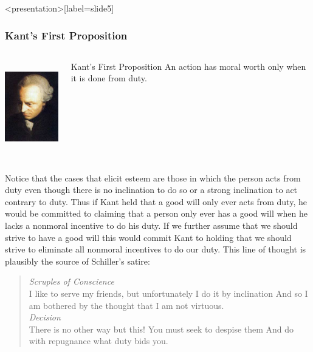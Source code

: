 \begin{frame}<presentation>[label=slide5]
    \frametitle{Kant's First Proposition}
        \begin{columns}
            \begin{column}{3cm}
                \includegraphics[height=4cm]{../../../graphics/kant.jpg}
            \end{column}
            \begin{column}{7cm}
                \begin{block}{Kant's First Proposition}
                    An action has moral worth only when it is done from duty.
                \end{block}
            \end{column}
        \end{columns}
\end{frame}

Notice that the cases that elicit esteem are those in which the person acts from duty even though there is no inclination to do so or a strong inclination to act contrary to duty. Thus if Kant held that a good will only ever acts from duty, he would be committed to claiming that a person only ever has a good will when he lacks a nonmoral incentive to do his duty. If we further assume that we should strive to have a good will this would commit Kant to holding that we should strive to eliminate all nonmoral incentives to do our duty. This line of thought is plausibly the source of Schiller's satire:

\begin{quote}
    \emph{Scruples of Conscience}\\
	I like to serve my friends, but unfortunately I do it by inclination And so I am bothered by the thought that I am not virtuous.\\
	\emph{Decision}\\
	There is no other way but this! You must seek to despise them And do with repugnance what duty bids you.
\end{quote}

